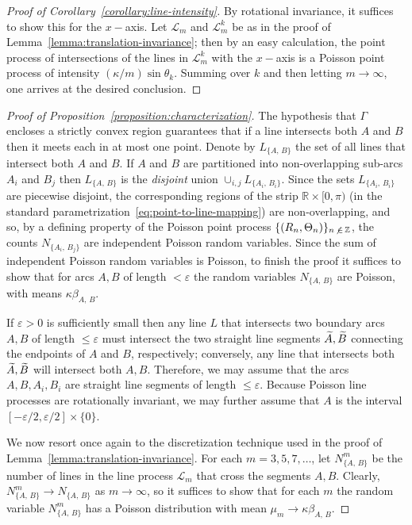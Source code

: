 \documentclass[AHL, Unicode, longabstracts, published]{cedram}
\newcommand{\zz}[1]{\mathbb #1}
\let\oldtilde\tilde
\renewcommand*{\tilde}[1]{\mathchoice{\widetilde{#1}}{\widetilde{#1}}{\oldtilde{#1}}{\oldtilde{#1}}}\let\oldforall\forall
\renewcommand*{\forall}{\mathrel{\oldforall}}
\begin{document}
\begin{proof}
[Proof of Corollary~\ref{corollary:line-intensity}]
By rotational invariance, it suffices to show this for the $x-$axis. Let $\mathcal{L}_{m}$ and $\mathcal{L}^{k}_{m}$ be as in the proof of Lemma~\ref{lemma:translation-invariance}; then by an easy calculation, the point process of intersections of the lines in $\mathcal{L}^{k}_{m}$ with the $x-$axis is a Poisson point process of intensity $(\kappa / m) \sin \theta_{k}$. Summing over $k$ and then letting $m \rightarrow \infty$, one arrives at the desired conclusion.
\end{proof}


\begin{proof}
[Proof of Proposition~\ref{proposition:characterization}]
The hypothesis that $\Gamma$ encloses a strictly convex region guarantees that if a line intersects both $A$ and $B$ then it meets each in at most one point. Denote by $L_{\{A,\,B\}}$ the set of all lines that intersect both $A$ and $B$. If $A$ and $B$ are partitioned into non-overlapping sub-arcs $A_{i}$ and $B_{j}$ then $L_{\{A,\,B\}}$ is the \emph{disjoint} union $\cup_{i,j}L_{\{A_{i},\,B_{i}\}}$. Since the sets $L_{\{A_{i},\,B_{i}\}}$ are piecewise disjoint, the corresponding regions of the strip $\zz{R}\times [0,\pi)$ (in the standard parametrization~\eqref{eq:point-to-line-mapping}) are non-overlapping, and so, by a defining property of the Poisson point process $\{(R_{n},\Theta_{n}) \}_{n\,\not\,\in\,\zz{Z}}$, the counts $N_{\{A_{i},\,B_{j}\}}$ are independent Poisson random variables. Since the sum of independent Poisson random variables is Poisson, to finish the proof it suffices to show that for arcs $A,B$ of length $<\varepsilon$ the random variables $N_{\{A,\,B\}}$ are Poisson, with means $\kappa \beta_{A,\,B}$.

If $\varepsilon >0$ is sufficiently small then any line $L$ that intersects two boundary arcs $A,B$ of length $\leq \varepsilon$ must intersect the two straight line segments $\tilde{A},\tilde{B}$ connecting the endpoints of $A$ and $B$, respectively; conversely, any line that intersects both $\tilde{A},\tilde{B}$ will intersect both $A,B$. Therefore, we may assume that the arcs $A,B,A_{i},B_{i}$ are straight line segments of length $\leq \varepsilon$. Because Poisson line processes are rotationally invariant, we may further assume that $A$ is the interval $[-\varepsilon /2,\varepsilon /2]\times \{0 \}$.

We now resort once again to the discretization technique used in the proof of Lemma~\ref{lemma:translation-invariance}. For each $m=3,5,7,\dotsc$, let $N^{m}_{\{A,\,B\}}$ be the number of lines in the line process $\mathcal{L}_{m}$ that cross the segments $A,B$. Clearly, $N^{m}_{\{A,\,B\}}\rightarrow N_{\{A,\,B\}}$ as $m \rightarrow \infty$, so it suffices to show that for each $m$ the random variable $N^{m}_{\{A,\,B\}}$ has a Poisson distribution with mean $\mu_{m}\rightarrow \kappa
\beta_{A,\,B}$.


\end{proof}
\end{document}
